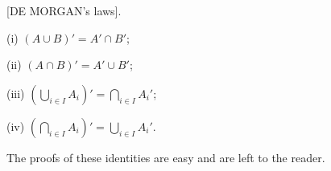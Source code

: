 [DE MORGAN's laws].

(i) $(A \cup B)' = A' \cap B'$;

(ii) $(A \cap B)' = A' \cup B'$;

(iii) $(\bigcup_{i \in I} A_i)' = \bigcap_{i \in I} A_i'$;

(iv) $(\bigcap_{i \in I} A_i)' = \bigcup_{i \in I} A_i'$.

The proofs of these identities are easy and are left to the reader.